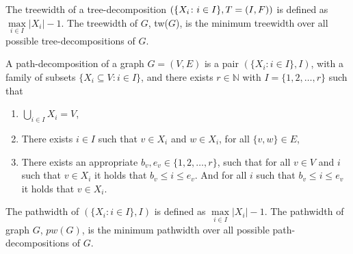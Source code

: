 \begin{definition}[Treewidth, $tw(G)$]
The treewidth of a tree-decomposition $(\{X_i \colon\break i \in
I\}, T=(I,F))$ is defined as $\max\limits_{i\in I} |X_i|-1$.
The treewidth of $G$, tw($G$), is the minimum treewidth over all possible tree-decompositions of $G$.
\end{definition}


\begin{definition}
    A path-decomposition of a graph $G=(V,E)$ is a pair $(\{ X_i \colon i \in I\}, I)$, with a family of subsets $\{ X_i \subseteq V \colon i \in I\}$, and there exists $r \in \mathbb{N}$ with $I=\{1,2,\dots,r\}$ such that
\begin{enumerate}
    \item $  \bigcup\limits_{i\in I} X_i=V$,
    \item There exists $i \in I$ such that $v \in X_i $ and $w \in X_i$, for all $\{v,w\} \in E$,
    \item There exists an appropriate $b_v, e_v \in \{1,2,\dots,r\}$, such that for all $v \in V$ and $i$ such that $v \in X_i$ it holds that $b_v \leq i \leq e_v$. And for all $i$ such that $b_v \leq i \leq e_v$ it holds that $v \in X_i$.
\end{enumerate}
\end{definition}

\begin{definition}[Pathwidth, $pw(G)$]
The pathwidth of $(\{ X_i \colon i \in I\}, I)$ is defined as $\max\limits_{i\in I} |X_i|-1$. The pathwidth of graph $G$, $pw(G)$, is the minimum pathwidth over all possible path-decompositions of $G$.
\end{definition}




